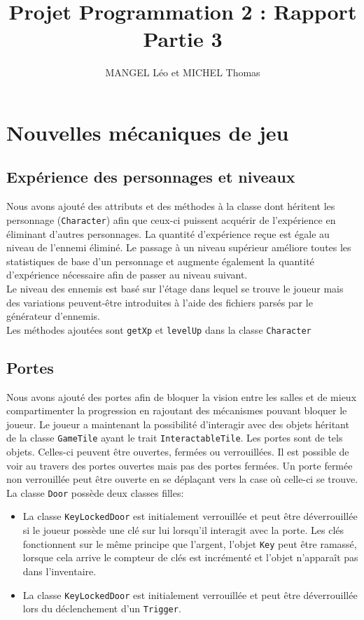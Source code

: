 \documentclass[10pt,a4paper]{article}
\title{Projet Programmation 2 : Rapport Partie 3}
\author{MANGEL Léo et MICHEL Thomas}
\date{}
\begin{document}
\maketitle

\section{Nouvelles mécaniques de jeu}
\subsection{Expérience des personnages et niveaux}
Nous avons ajouté des attributs et des méthodes à la classe dont héritent les personnage (\texttt{Character}) afin que ceux-ci puissent acquérir de l'expérience en éliminant d'autres personnages. La quantité d'expérience reçue est égale au niveau de l'ennemi éliminé. Le passage à un niveau supérieur améliore toutes les statistiques de base d'un personnage et augmente également la quantité d'expérience nécessaire afin de passer au niveau suivant.\\
Le niveau des ennemis est basé sur l'étage dans lequel se trouve le joueur mais des variations peuvent-être introduites à l'aide des fichiers parsés par le générateur d'ennemis.\\
Les méthodes ajoutées sont \texttt{getXp} et \texttt{levelUp} dans la classe \texttt{Character}

\subsection{Portes}
Nous avons ajouté des portes afin de bloquer la vision entre les salles et de mieux compartimenter la progression en rajoutant des mécanismes pouvant bloquer le joueur. Le joueur a maintenant la possibilité d'interagir avec des objets héritant de la classe \texttt{GameTile} ayant le trait \texttt{InteractableTile}. Les portes sont de tels objets. Celles-ci peuvent être ouvertes, fermées ou verrouillées. Il est possible de voir au travers des portes ouvertes mais pas des portes fermées. Un porte fermée non verrouillée peut être ouverte en se déplaçant vers la case où celle-ci se trouve.\\
La classe \texttt{Door} possède deux classes filles:
\begin{itemize}
	\item La classe \texttt{KeyLockedDoor} est initialement verrouillée et peut être déverrouillée si le joueur possède une clé sur lui lorsqu'il interagit avec la porte. Les clés fonctionnent sur le même principe que l'argent, l'objet \texttt{Key} peut être ramassé, lorsque cela arrive le compteur de clés est incrémenté et l'objet n'apparaît pas dans l'inventaire.
	\item La classe \texttt{KeyLockedDoor} est initialement verrouillée et peut être déverrouillée lors du déclenchement d'un \texttt{Trigger}.
\end{itemize}
\end{document}
